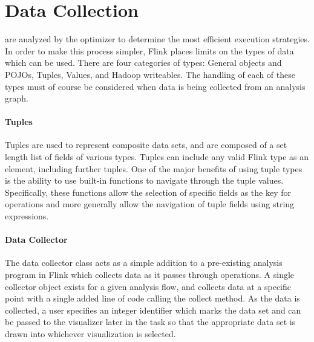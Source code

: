\section{Data Collection}
\label{sec:data_collection}
 are analyzed by the optimizer to determine the most efficient execution strategies. In order to make this process simpler, Flink places limits on the types of data which can be used. There are four categories of types: General objects and POJOs, Tuples, Values, and Hadoop writeables. The handling of each of these types must of course be considered when data is being collected from an analysis graph.

\paragraph{Tuples}
Tuples are used to represent composite data sets, and are composed of a set length list of fields of various types. Tuples can include any valid Flink type as an element, including further tuples. One of the major benefits of using tuple types is the ability to use built-in functions to navigate through the tuple values. Specifically, these functions allow the selection of specific fields as the key for operations and more generally allow the navigation of tuple fields using string expressions.

\paragraph{Data Collector}
The data collector class acts as a simple addition to a pre-existing analysis program in Flink which collects data as it passes through operations. A single collector object exists for a given analysis flow, and collects data at a specific point with a single added line of code calling the collect method. As the data is collected, a user specifies an integer identifier which marks the data set and can be passed to the visualizer later in the task so that the appropriate data set is drawn into whichever visualization is selected. 

